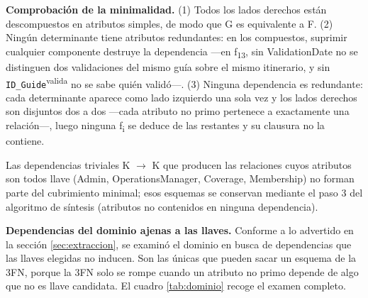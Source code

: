 \documentclass[11pt,a4paper]{article}
\begin{document}
\textbf{Comprobación de la minimalidad.} (1) Todos los lados derechos están descompuestos en atributos simples, de modo que G es equivalente a F. (2) Ningún determinante tiene atributos redundantes: en los compuestos, suprimir cualquier componente destruye la dependencia —en f\textsubscript{13}, sin ValidationDate no se distinguen dos validaciones del mismo guía sobre el mismo itinerario, y sin \texttt{ID\_Guide}\textsuperscript{valida} no se sabe quién validó—. (3) Ninguna dependencia es redundante: cada determinante aparece como lado izquierdo una sola vez y los lados derechos son disjuntos dos a dos —cada atributo no primo pertenece a exactamente una relación—, luego ninguna f\textsubscript{i} se deduce de las restantes y su clausura no la contiene.

Las dependencias triviales K \ensuremath{\rightarrow} K que producen las relaciones cuyos atributos son todos llave (Admin, OperationsManager, Coverage, Membership) no forman parte del cubrimiento minimal; esos esquemas se conservan mediante el paso 3 del algoritmo de síntesis (atributos no contenidos en ninguna dependencia).

\textbf{Dependencias del dominio ajenas a las llaves.} Conforme a lo advertido en la sección \ref{sec:extraccion}, se examinó el dominio en busca de dependencias que las llaves elegidas no inducen. Son las únicas que pueden sacar un esquema de la 3FN, porque la 3FN solo se rompe cuando un atributo no primo depende de algo que no es llave candidata. El cuadro \ref{tab:dominio} recoge el examen completo.
\end{document}
